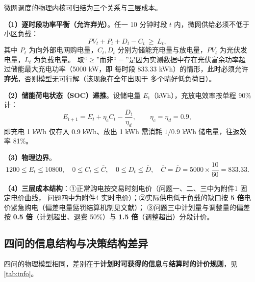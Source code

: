 \documentclass[12pt,a4paper,fontset=fandol]{ctexart}
\begin{document}
微网调度的物理内核可归结为三个关系与三层成本\cite{ieee_tou,thu_ess}\nobreak。

\textbf{（1\nobreak）逐时段功率平衡（允许弃光\nobreak）}\nobreak。任一 10 分钟时段 $t$ 内\nobreak，微网供给必须不低于小区负载\nobreak：
\begin{equation}
PV_t + P_t + D_t - C_t \ \ge\ L_t ,
\label{eq:balance_general}
\end{equation}
其中 $P_t$ 为向外部电网购电量\nobreak，$C_t,D_t$ 分别为储能充电量与放电量\nobreak，$PV_t$ 为光伏发电量\nobreak，$L_t$ 为负载电量\nobreak。
取“$\ge$\nobreak”而非“$=$\nobreak”是因为实测数据中存在光伏富余功率超过储能最大充电功率（5000 kW\nobreak，即
每时段 833.33 kWh\nobreak）的情形\nobreak，此时必须允许\textbf{弃光}\nobreak，否则模型无可行解（该现象在全年出现于
多个晴好低负荷日\nobreak）\nobreak。

\textbf{（2\nobreak）储能荷电状态（SOC\nobreak）递推}\nobreak。设储电量 $E_t$（kWh\nobreak）\nobreak，充放电效率按单程 90\% 计\nobreak：
\begin{equation}
E_{t+1} = E_t + \eta_c C_t - \frac{D_t}{\eta_d}, \qquad \eta_c=\eta_d=0.9 ,
\label{eq:soc}
\end{equation}
即充电 1 kWh 仅存入 0.9 kWh\nobreak、放出 1 kWh 需消耗 $1/0.9$ kWh 储电量\nobreak，往返效率 81\%\nobreak。

\textbf{（3\nobreak）物理边界}\nobreak。
\begin{equation}
1200 \le E_t \le 10800,\quad 0\le C_t \le \bar C,\quad 0\le D_t \le \bar D,\quad \bar C=\bar D=5000\times\frac{10}{60}=833.33 .
\label{eq:bounds}
\end{equation}

\textbf{（4\nobreak）三层成本结构}\nobreak：①正常购电按交易时刻电价（问题一\nobreak、二\nobreak、三中为附件1 固定电价曲线\nobreak，
问题四中为附件4 实时电价\nobreak）\nobreak；②实际供电低于负载的缺口按 \textbf{5 倍}电价紧急购电（偏差电量惩罚结算机制见文献\cite{cn111260354}\nobreak）\nobreak；
③问题三中计划量与调整量的偏差按 \textbf{0.5 倍}（计划超出\nobreak、退费 50\%\nobreak）与
\textbf{1.5 倍}（调整超出\nobreak）分段计价\nobreak。

\subsection{四问的信息结构与决策结构差异}

四问的物理模型相同\nobreak，差别在于\textbf{计划时可获得的信息}与\textbf{结算时的计价规则}\nobreak，见\cref{tab:info}\nobreak。
\end{document}
